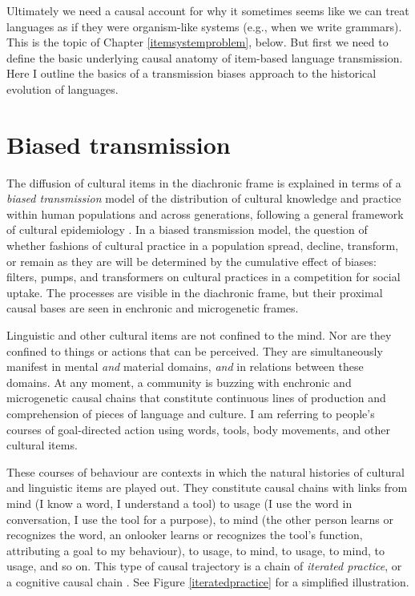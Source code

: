 Ultimately we need a causal account for why it sometimes seems like we 
can treat languages as if they were organism-like systems (e.g., when we 
write grammars). This is the topic of Chapter \ref{itemsystemproblem}, below. But first we need to define the basic underlying causal anatomy of item-based 
language transmission. Here I outline the basics of a transmission 
biases approach to the historical evolution of languages. 



\section{Biased transmission}


The diffusion of cultural items in the diachronic frame is explained in terms of a \textit{biased transmission} model of the distribution of cultural knowledge 
and practice within human populations and across generations, following 
a general framework of cultural epidemiology \citep{sperber_anthropology_1985,sperber_explaining_1996,boyd_culture_1985,boyd_origin_2005,enfield_linguistic_2003,enfield_transmission_2008}. In a biased transmission model, the question of whether 
fashions of cultural practice in a population spread, decline, 
transform, or remain as they are will be determined by the cumulative 
effect of biases: filters, pumps, and transformers 
on cultural practices in a competition for social uptake. The processes are visible in the diachronic frame, but their proximal causal bases are seen in enchronic and microgenetic frames.



Linguistic and other cultural items are not confined to the mind. Nor are they confined to things or actions that can be perceived. They are simultaneously manifest in mental \textit{and} 
material domains, \textit{and} in relations between these domains. At 
any moment, a community is buzzing with enchronic and microgenetic causal chains that constitute continuous lines of 
production and comprehension of pieces of language and culture. I am 
referring to people's courses of goal-directed action using words, tools, body movements, 
and other cultural items. 



These courses of behaviour are contexts in which the natural 
histories of cultural and linguistic items are played out. They 
constitute causal chains with links from mind (I know a word, I 
understand a tool) to usage (I use the word in conversation, I 
use the tool for a purpose), to mind (the other person learns or recognizes 
the word, an onlooker learns or recognizes the tool's 
function, attributing a goal to my behaviour), to usage, to mind, to 
usage, to mind, to usage, and so on. This type of causal 
trajectory is a chain of \textit{iterated practice}, or a cognitive 
causal chain \citep{sperber_why_2006-1}. See Figure \ref{iteratedpractice} for a simplified illustration.





